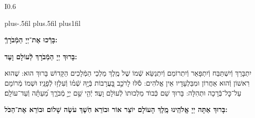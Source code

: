 \documentclass[twoside, openany, parskip=half, 11pt]{book}
\begin{document}
\newcommand{\barachu}{
\begin{wrapfigure}[5]{I}{0.6\textwidth}
\begin{minipage}{0.6\textwidth}
\leftskip=0pt plus-.5fil
\rightskip=0pt plus.5fil
\parfillskip=0pt plus1fil
\begin{large}

\shatz
\begin{Large}\textbf{בָּרְֿכוּ אֶת־יְיָ הַמְֿבֹרָךְֿ:}\end{Large}
\end{large}

\vspace{12pt}

\shatzvkahal
\textbf{בָּרוּךְ יְיָ הַמְֿבֹרָךְ לְֿעוֹלָם וָעֶד:}
\end{minipage}
\end{wrapfigure}

\begin{footnotesize}
יִתְבָּרַךְ וְֿיִשְׁתַּבַּח וְֿיִתְפָּאַר וְֿיִתְרוֹמַם וְֿיִתְנַשֵּׂא שְֿׁמוֹ שֶׁל מֶֽלֶךְ מַלְכֵי הַמְּֿלָכִים הַקָּדוֹשׁ בָּרוּךְ הוּא: שֶׁהוּא רִאשׁוֹן וְֿהוּא אַחֲרוֹן וּמִבַּלְעָדָיו אֵין אֱלֹהִים: \source{תהלים סח}סֹ֡לּוּ לָרֹכֵ֣ב בָּ֭עֲרָבוֹת בְּֿיָ֥הּ שְֿׁמ֗וֹ וְֿעִלְז֥וּ לְֿפָנָֽיו׃ וּשְׁמוֹ מְֿרוֹמָם עַל־כׇּל־בְּֿרָכָה וּתְהִלָּה: בָּרוּךְ שֵׁם כְּֿבוֺד מַלְכוּתוֺ לְֿעוֺלָם וָעֶד׃ \source{תהלים קיג}יְֿהִ֤י שֵׁ֣ם יְיָ֣ מְֿבֹרָ֑ךְ מֵ֝עַתָּ֗ה וְֿעַד־עוֹלָֽם׃

\end{footnotesize}
}


\barachu

\textbf{
בָּרוּךְ אַתָּה יְיָ אֱלֹהֵֽינוּ מֶֽלֶךְ הָעוֹלָם יוֹצֵר אוֹר וּבוֹרֵא חֹֽשֶׁךְ עֹשֶׂה שָׁלוֹם וּבוֹרֵא אֶת־הַכֹּל:
}

\newcommand{\hameir}{
\firstword{הַמֵּאִיר}
לָאָֽרֶץ וְֿלַדָּרִים עָלֶֽיהָ בְּֿרַחֲמִים וּבְטוּבוֹ מְֿחַדֵּשׁ בְּֿכׇל־יוֹם תָּמִיד מַעֲשֵׂה בְֿרֵאשִׁית: \source{תהלים קד}מָה־רַבּ֬וּ מַעֲשֶׂ֨יךָ ׀ יְיָ֗ כֻּ֭לָּם בְּֿחׇכְמָ֣ה עָשִׂ֑יתָ מָלְֿאָ֥ה הָ֝אָ֗רֶץ קִנְיָנֶֽךָ׃ הַמֶּֽלֶךְ הַמְֿרוֹמָם לְֿבַדּוֹ מֵאָז הַמְֿשֻׁבָּח וְֿהַמְֿפֹאָר וְֿהַמִּתְנַשֵּׂא מִימוֹת עוֹלָם: אֱלֹהֵי עוֹלָם בְּֿרַחֲמֶיךָ הָרַבִּים רַחֵם עָלֵינוּ אֲדוֹן עֻזֵּֽנוּ צוּר מִשְׂגַּבֵּנוּ מָגֵן יִשְׁעֵֽנוּ מִשְׂגָּב בַּעֲדֵֽנוּ: אֵ֗ל בָּ֗רוּךְ גְּֿ֗דוֹל דֵּ֗עָה הֵ֗כִין וּ֗פָעַל זׇׇׇׇׇָ֗הֳרֵי חַ֗מָּה ט֗וֹב יָ֗צַר כָּ֗בוֹד לִ֗שְׁמוֹ מְֿ֗אוֹרוֹת נָ֗תַן סְֿ֗בִיבוֹת עֻ֗זּוֹ פִּ֗נּוֹת צְֿ֗בָאָיו קְֿ֗דוֹשִׁים ר֗וֹמֲמֵי שַׁ֗דַּי תָּ֗מִיד מְֿסַפְּֿרִים כְּֿבוֹד־אֵל וּקְדֻשָׁתוֹ: תִּתְבָּרַךְ יְיָ אֱלֹהֵֽינוּ עַל־שֶׁבַח מַעֲשֵׂי יָדֶֽיךָ וְֿעַל־מְאֽוֹרֵי אוֹר שֶׁעָשִֽׂיתָ יְֿפָאֲרֽוּךָ סֶּֽלָה:
}

\newcommand{\kadoshkadoshkadosh}{•}
\end{document}

